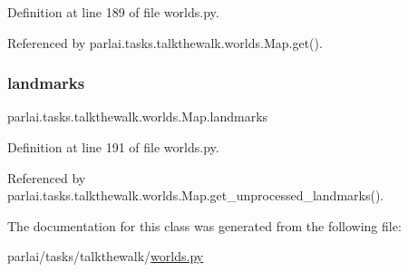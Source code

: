 Definition at line 189 of file worlds.\+py.



Referenced by parlai.\+tasks.\+talkthewalk.\+worlds.\+Map.\+get().

\mbox{\label{classparlai_1_1tasks_1_1talkthewalk_1_1worlds_1_1Map_a11ed4a0cac5c44b1a61dc702378e5b9f}} 
\subsubsection{\texorpdfstring{landmarks}{landmarks}}
{\footnotesize\ttfamily parlai.\+tasks.\+talkthewalk.\+worlds.\+Map.\+landmarks}



Definition at line 191 of file worlds.\+py.



Referenced by parlai.\+tasks.\+talkthewalk.\+worlds.\+Map.\+get\+\_\+unprocessed\+\_\+landmarks().



The documentation for this class was generated from the following file\+:\begin{DoxyCompactItemize}
\item 
parlai/tasks/talkthewalk/\hyperlink{parlai_2tasks_2talkthewalk_2worlds_8py}{worlds.\+py}\end{DoxyCompactItemize}
